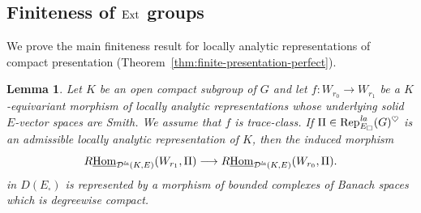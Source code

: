 \documentclass[a4paper,10pt]{amsart}
\theoremstyle{remark}
\theoremstyle{definition}
\theoremstyle{plain}
\newtheorem{lemma}[theorem]{Lemma}
\numberwithin{equation}{section}
\newcommand{\calD}{{\mathcal D}}
\newcommand{\Ext}{{\rm Ext}}
\newcommand{\Hom}{{\rm Hom}}
\newcommand{\la}{{\it la}}
\newcommand{\Rep}{{\rm Rep}}
\begin{document}
\subsection{Finiteness of $\Ext$ groups}
We prove the main finiteness result for locally analytic representations of compact presentation (Theorem~\ref{thm:finite-presentation-perfect}).
\begin{lemma}\label{lemmahomsmithadmissible}
Let $K$ be an open compact subgroup of $G$ and let $f:W_{r_0}\to W_{r_1}$ be a $K$-equivariant morphism of locally analytic representations whose underlying solid $E$-vector spaces are Smith. We assume that $f$ is trace-class.  If $\Pi\in \Rep_{E_{\square}}^{\la}(G)^{\heartsuit}$ is an admissible locally analytic representation of $K$, then the induced morphism
\[
 R\underline{\Hom}_{\calD^{\la}(K,E)}(W_{r_1},\Pi)
 \longrightarrow
 R\underline{\Hom}_{\calD^{\la}(K,E)}(W_{r_0},\Pi).
\]
in $D(E_{\square})$ is represented by a morphism of bounded complexes of
Banach spaces which is degreewise compact.
\end{lemma}
\end{document}
